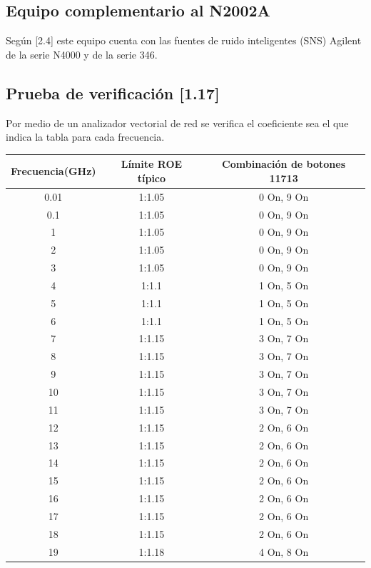 \subsection{Equipo complementario al N2002A}
Según [2.4] este equipo cuenta con las fuentes de ruido inteligentes (SNS) Agilent de la serie N4000 y de la serie 346.

\subsection{Prueba de verificación [1.17]}
Por medio de un analizador vectorial de red se verifica el coeficiente sea el que indica la tabla para cada frecuencia.

\begin{table} 
	\begin{tabular}{ccc}
		\toprule
		\textbf{Frecuencia(\si{\giga\hertz})} & \textbf{Límite ROE \newline típico} & \textbf{Combinación \newline de botones 11713} \\
		\midrule
		0.01 	&	1:1.05	&	0 On, 9 On \\
		0.1 	&	1:1.05	&	0 On, 9 On \\
		1	 	&	1:1.05	&	0 On, 9 On \\
		2 		&	1:1.05	&	0 On, 9 On \\
		3 		&	1:1.05	&	0 On, 9 On \\
		4 		&	1:1.1	&	1 On, 5 On \\
		5 		&	1:1.1	&	1 On, 5 On \\
		6	  	&	1:1.1	&	1 On, 5 On \\
		7	 	&	1:1.15	&	3 On, 7 On \\
		8	 	&	1:1.15	&	3 On, 7 On \\
		9	 	&	1:1.15	&	3 On, 7 On \\
		10	 	&	1:1.15	&	3 On, 7 On \\
		11	 	&	1:1.15	&	3 On, 7 On \\
		12	 	&	1:1.15	&	2 On, 6 On \\
		13	 	&	1:1.15	&	2 On, 6 On \\
		14	 	&	1:1.15	&	2 On, 6 On \\
		15	 	&	1:1.15	&	2 On, 6 On \\
		16	 	&	1:1.15	&	2 On, 6 On \\
		17	 	&	1:1.15	&	2 On, 6 On \\																																				
		18	 	&	1:1.15	&	2 On, 6 On \\
		19	 	&	1:1.18	&	4 On, 8 On \\

\end{tabular}
\end{table}
